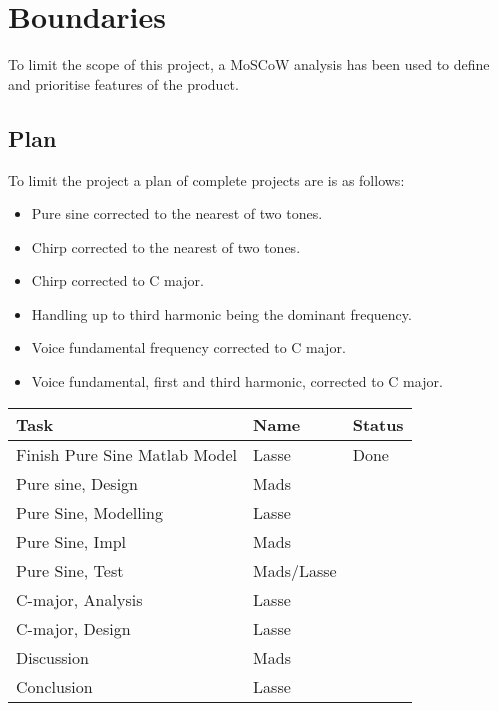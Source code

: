 
\chapter{Boundaries}
\label{sec:Boundaries}
To limit the scope of this project, a MoSCoW analysis has been used to define and prioritise features of the product.

\section{Plan}
To limit the project a plan of complete projects are is as follows:

\begin{itemize}
	\item Pure sine corrected to the nearest of two tones.
	\item Chirp corrected to the nearest of two tones.
	\item Chirp corrected to C major.
	\item Handling up to third harmonic being the dominant frequency.
	\item Voice fundamental frequency corrected to C major.
	\item Voice fundamental, first and third harmonic, corrected to C major.
\end{itemize}

\begin{table}
	\centering
	\begin{tabular}{l l l}
		\toprule
		Task & Name & Status \\
		\midrule
		Finish Pure Sine Matlab Model & Lasse & Done \\
		Pure sine, Design & Mads & \\
		Pure Sine, Modelling & Lasse & \\
		Pure Sine, Impl & Mads & \\
		Pure Sine, Test & Mads/Lasse & \\
		C-major, Analysis & Lasse & \\
		C-major, Design & Lasse & \\
		Discussion & Mads & \\
		Conclusion & Lasse & \\
		\bottomrule
	\end{tabular}
\end{table}